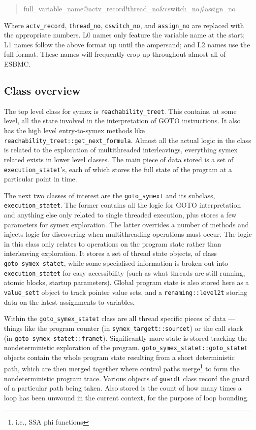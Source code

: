 \documentclass{article}
\begin{document}
\begin{quote}
full\_variable\_name@actv\_record!thread\_no\&cswitch\_no\#assign\_no
\end{quote}

Where \texttt{actv\_record}, \texttt{thread\_no}, \texttt{cswitch\_no}, and
\texttt{assign\_no} are replaced with the appropriate numbers. L0 names only
feature the variable name at the start; L1 names follow the above format
up until the ampersand; and L2 names use the full format. These names will
frequently crop up throughout almost all of ESBMC.

\subsection{Class overview}

The top level class for symex is \texttt{reachability\_treet}. This contains,
at some level, all the state involved in the interpretation of GOTO
instructions. It also has the high level entry-to-symex methods like
\texttt{reachability\_treet::get\_next\_formula}. Almost all the actual
logic in the class is related to the exploration of multithreaded interleavings,
everything symex related exists in lower level classes. The main piece of
data stored is a set of \texttt{execution\_statet}'s, each of which stores
the full state of the program at a particular point in time.

The next two classes of interest are the \texttt{goto\_symext} and its
subclass, \texttt{execution\_statet}. The former contains all the logic
for GOTO interpretation and anything else only related to single threaded
execution, plus stores a few parameters for symex exploration. The latter
overrides a number of methods and injects logic for discovering when
multithreading operations must occur. The logic in this class only relates
to operations on the program state rather than interleaving exploration.
It stores a set of thread state objects, of class
\texttt{goto\_symex\_statet}, while some specialised information is broken out
into \texttt{execution\_statet} for easy accessibility (such as what threads
are still running, atomic blocks, startup parameters). Global program state
is also stored here as a \texttt{value\_sett} object to track pointer value
sets, and a \texttt{renaming::level2t} storing data on the latest assignments
to variables.

Within the \texttt{goto\_symex\_statet} class are all thread specific pieces
of data --- things like the program counter (in
\texttt{symex\_targett::sourcet}) or the call stack (in
\texttt{goto\_symex\_statet::framet}). Significantly more state is stored
tracking the nondeterministic exploration of the program.
\texttt{goto\_symex\_statet::goto\_statet} objects contain the whole program
state resulting from a short deterministic path, which are then merged together
where control paths merge\footnote{i.e., SSA phi functions} to form the
nondeterministic program trace. Various objects of \texttt{guardt} class
record the guard of a particular path being taken. Also stored is the count
of how many times a loop has been unwound in the current context, for the
purpose of loop bounding.
\end{document}
